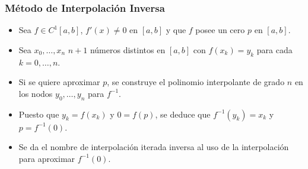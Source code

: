 \documentclass[10pt]{beamer}
\begin{document}
\begin{frame}
  \frametitle{M\'etodo de Interpolaci\'on Inversa}
  \begin{itemize}
    \item Sea $f \in C^1[a,b]$, $f'(x) \neq 0$ en $[a,b]$ y que $f$ posee un cero $p$ en $[a,b]$.
    \item<2-> Sea $x_0,\ldots,x_n$ $n+1$ n\'umeros distintos en $[a,b]$ con $f(x_k)=y_k$ para cada $k=0,\ldots,n$.
    \item<3-> Si se quiere aproximar $p$, se construye el 
    polinomio interpolante de grado $n$ en los nodos $y_0,\ldots,y_n$ para $f^{-1}$.
    \item<4-> Puesto que $y_k=f(x_k)$ y $0=f(p)$, se 
    deduce que $f^{-1}(y_k)=x_k$ y $p=f^{-1}(0)$.
    \item<5-> Se da el nombre de interpolaci\'on iterada inversa al uso de la
    interpolaci\'on para aproximar $f^{-1}(0)$.
  \end{itemize}  
\end{frame}
\end{document}
